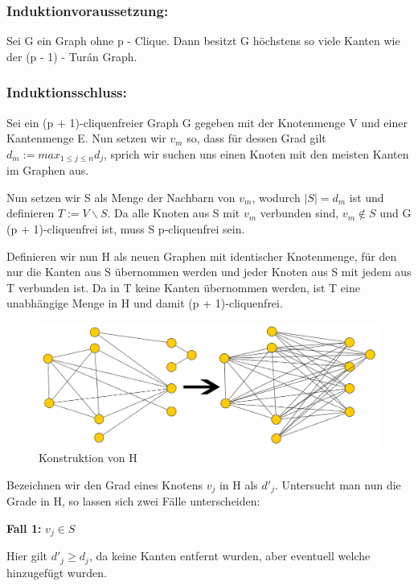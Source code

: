 \documentclass[12pt, a4paper]{article}
\begin{document}
\subsubsection{Induktionvoraussetzung:}

Sei G ein Graph ohne p - Clique. Dann besitzt G höchstens so viele Kanten wie der (p - 1) - Turán Graph.

\subsubsection{Induktionsschluss:}

Sei ein (p + 1)-cliquenfreier Graph G gegeben mit der Knotenmenge V und einer Kantenmenge E. Nun setzen wir $v_m$ so, dass für dessen Grad gilt $d_m := max_{1 \le j \le n} d_j$, sprich wir suchen uns einen Knoten mit den meisten Kanten im Graphen aus.

Nun setzen wir S als Menge der Nachbarn von $v_m$, wodurch $\mid S \mid = d_m$ ist und definieren $T := V \backslash S$. Da alle Knoten aus S mit $v_m$ verbunden sind, $v_m \notin S$ und G (p + 1)-cliquenfrei ist, muss S p-cliquenfrei sein.

Definieren wir nun H als neuen Graphen mit identischer Knotenmenge, für den nur die Kanten aus S übernommen werden und jeder Knoten aus S mit jedem aus T verbunden ist. Da in T keine Kanten übernommen werden, ist T eine unabhängige Menge in H und damit (p + 1)-cliquenfrei.

\begin{figure}[H] 
		\centering
		\includegraphics[page=1, width=\textwidth]{assets/proof2}
		\caption{Konstruktion von H} 
\end{figure}

Bezeichnen wir den Grad eines Knotens $v_j$ in H als $d'_j$. Untersucht man nun die Grade in H, so lassen sich zwei Fälle unterscheiden:

\textbf{Fall 1:} $v_j \in S$

Hier gilt $d'_j \ge d_j$, da keine Kanten entfernt wurden, aber eventuell welche hinzugefügt wurden.
\end{document}
